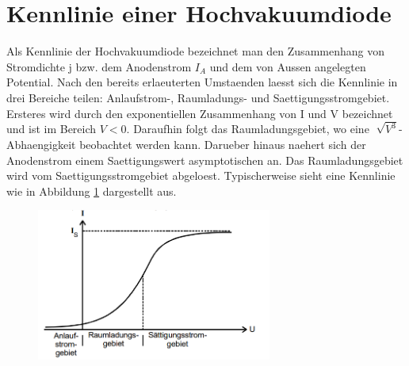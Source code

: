 \section{Kennlinie einer Hochvakuumdiode}
Als Kennlinie der Hochvakuumdiode bezeichnet man den Zusammenhang von Stromdichte j bzw. dem Anodenstrom $I_A$ und dem von Aussen angelegten Potential. Nach den bereits erlaeuterten Umstaenden laesst sich die Kennlinie in drei Bereiche teilen: Anlaufstrom-, Raumladungs- und Saettigungsstromgebiet. \\
Ersteres wird durch den exponentiellen Zusammenhang von I und V bezeichnet und ist im Bereich $V<0$. Daraufhin folgt das Raumladungsgebiet, wo eine $\sqrt[]{V^3}$-Abhaengigkeit beobachtet werden kann. Darueber hinaus naehert sich der Anodenstrom einem Saettigungswert asymptotischen an. Das Raumladungsgebiet wird vom Saettigungsstromgebiet abgeloest. Typischerweise sieht eine Kennlinie wie in Abbildung \ref{Fig:Kennlinie} dargestellt aus.  
\begin{figure}[H]
    \centering
    \captionsetup{justification=centering}
    \includegraphics[height=5cm]{"Kennlinie_emission.png"}
    \label{Fig:Kennlinie}
\end{figure}







